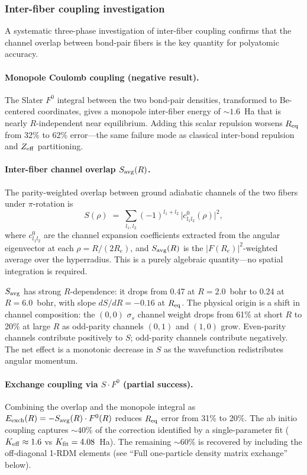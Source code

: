 \documentclass[aps,pra,twocolumn,superscriptaddress,longbibliography,floatfix]{revtex4-2}
\begin{document}
\subsubsection{Inter-fiber coupling investigation}

A systematic three-phase investigation of inter-fiber coupling confirms
that the channel overlap between bond-pair fibers is the key quantity
for polyatomic accuracy.

\paragraph{Monopole Coulomb coupling (negative result).}
The Slater $F^0$ integral between the two bond-pair densities,
transformed to Be-centered coordinates, gives a monopole inter-fiber
energy of ${\sim}1.6$~Ha that is nearly $R$-independent near
equilibrium.  Adding this scalar repulsion worsens $R_{\rm eq}$ from
32\% to 62\% error---the same failure mode as classical inter-bond
repulsion and $Z_{\rm eff}$ partitioning.

\paragraph{Inter-fiber channel overlap $S_{\rm avg}(R)$.}
The parity-weighted overlap between ground adiabatic channels of the
two fibers under $\pi$-rotation is
\begin{equation}
  S(\rho) \;=\; \sum_{l_1, l_2} (-1)^{l_1 + l_2}\,
  \bigl|c^{0}_{l_1 l_2}(\rho)\bigr|^2,
  \label{eq:S_overlap}
\end{equation}
where $c^{0}_{l_1 l_2}$ are the channel expansion coefficients
extracted from the angular eigenvector at each $\rho = R/(2R_e)$,
and $S_{\rm avg}(R)$ is the $|F(R_e)|^2$-weighted average over
the hyperradius.  This is a purely algebraic quantity---no spatial
integration is required.

$S_{\rm avg}$ has strong $R$-dependence: it drops from 0.47 at
$R = 2.0$~bohr to 0.24 at $R = 6.0$~bohr, with slope
$dS/dR = -0.16$ at $R_{\rm eq}$.  The physical origin is a shift
in channel composition: the $(0{,}0)$ $\sigma_s$ channel weight
drops from 61\% at short $R$ to 20\% at large $R$ as odd-parity
channels $(0{,}1)$ and $(1{,}0)$ grow.  Even-parity channels
contribute positively to $S$; odd-parity channels contribute
negatively.  The net effect is a monotonic decrease in $S$ as the
wavefunction redistributes angular momentum.

\paragraph{Exchange coupling via $S \cdot F^0$ (partial success).}
Combining the overlap and the monopole integral as
$E_{\rm exch}(R) = -S_{\rm avg}(R) \cdot F^0(R)$ reduces $R_{\rm eq}$
error from 31\% to 20\%.  The ab initio coupling captures ${\sim}40\%$
of the correction identified by a single-parameter fit
($K_{\rm eff} \approx 1.6$ vs $K_{\rm fit} = 4.08$~Ha).  The
remaining ${\sim}60\%$ is recovered by including the off-diagonal
1-RDM elements (see ``Full one-particle density matrix exchange''
below).
\end{document}
